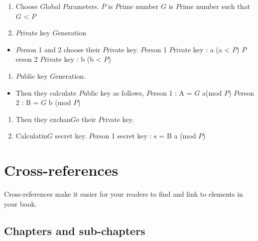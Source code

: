 \documentclass[
]{book}
\providecommand{\tightlist}{%
  \setlength{\itemsep}{0pt}\setlength{\parskip}{0pt}}
\begin{document}
\begin{enumerate}
\def\labelenumi{\arabic{enumi}.}
\tightlist
\item
  Choose \(G\)lobal \(P\)arameters.
  \(P\) is \(P\)rime number
  \(G\) is \(P\)rime number such that \(G\) \textless{} \(P\)
\item
  \(P\)rivate key \(G\)eneration
\end{enumerate}

\begin{itemize}
\tightlist
\item
  \(P\)erson 1 and 2 choose their \(P\)rivate key.
  \(P\)erson 1 \(P\)rivate key : a (a \textless{} \(P\))
  \(P\)erson 2 \(P\)rivate key : b (b \textless{} \(P\))
\end{itemize}

\begin{enumerate}
\def\labelenumi{\arabic{enumi}.}
\setcounter{enumi}{2}
\tightlist
\item
  \(P\)ublic key \(G\)eneration.
\end{enumerate}

\begin{itemize}
\tightlist
\item
  Then they calculate \(P\)ublic key as follows,
  \(P\)erson 1 : A = \(G\)
  a(mod \(P\))
  \(P\)erson 2 : B = \(G\)
  b (mod \(P\))
\end{itemize}

\begin{enumerate}
\def\labelenumi{\arabic{enumi}.}
\setcounter{enumi}{3}
\tightlist
\item
  Then they exchan\(G\)e their \(P\)rivate key.
\item
  Calculatin\(G\) secret key.
  \(P\)erson 1 secret key : s = B a (mod \(P\))
\end{enumerate}

\hypertarget{cross}{%
\chapter{Cross-references}\label{cross}}

Cross-references make it easier for your readers to find and link to elements in your book.

\hypertarget{chapters-and-sub-chapters}{%
\section{Chapters and sub-chapters}\label{chapters-and-sub-chapters}}
\end{document}
